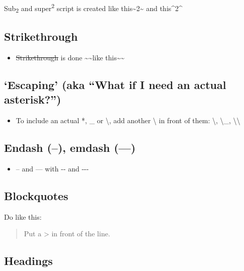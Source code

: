 \documentclass[a4paper, twoside]{templates/ociamthesis}
\providecommand{\tightlist}{%
  \setlength{\itemsep}{0pt}\setlength{\parskip}{0pt}}
\theoremstyle{definition}
\theoremstyle{definition}
\theoremstyle{definition}
\theoremstyle{definition}
\theoremstyle{remark}
\begin{document}
Sub\textsubscript{2} and super\textsuperscript{2} script is created like this\textasciitilde2\textasciitilde{} and this\^{}2\^{}

\hypertarget{strikethrough}{%
\subsection{Strikethrough}\label{strikethrough}}

\begin{itemize}
\tightlist
\item
  \sout{Strikethrough} is done \textasciitilde\textasciitilde like this\textasciitilde\textasciitilde{}
\end{itemize}

\hypertarget{escaping-aka-what-if-i-need-an-actual-asterisk}{%
\subsection{`Escaping' (aka ``What if I need an actual asterisk?'')}\label{escaping-aka-what-if-i-need-an-actual-asterisk}}

\begin{itemize}
\tightlist
\item
  To include an actual *, \_ or \textbackslash, add another \textbackslash{} in front of them: \textbackslash*, \textbackslash\_, \textbackslash\textbackslash{}
\end{itemize}

\hypertarget{endash-emdash}{%
\subsection{Endash (--), emdash (---)}\label{endash-emdash}}

\begin{itemize}
\tightlist
\item
  -- and --- with -\/- and -\/-\/-
\end{itemize}

\hypertarget{blockquotes}{%
\subsection{Blockquotes}\label{blockquotes}}

Do like this:

\begin{quote}
Put a \textgreater{} in front of the line.
\end{quote}

\hypertarget{headings}{%
\subsection{Headings}\label{headings}}
\end{document}
